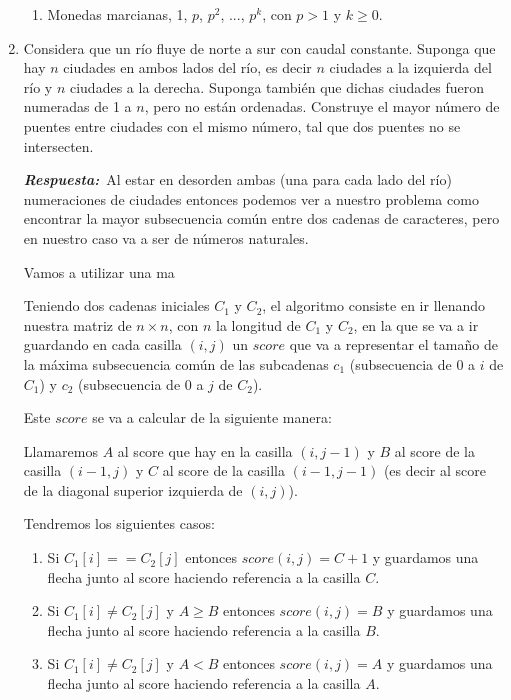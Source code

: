 \documentclass[11pt,letterpaper]{article}
\newcommand\respuesta{\textbf{\textit{Respuesta:}}}
\begin{document}
\begin{enumerate}[leftmargin=*]
\begin{enumerate}[label=\alph*)]
        \item Monedas marcianas, 1, $p$, $p^2$, ..., $p^k$, con $p > 1$ y $k \geq 0$.
    \end{enumerate}
    
    \item Considera que un río fluye de norte a sur con caudal constante. Suponga que hay $n$ ciudades en ambos lados del río, es decir $n$ ciudades a la izquierda del río y $n$ ciudades a la derecha. Suponga también que dichas ciudades fueron numeradas de 1 a $n$, pero no están ordenadas. Construye el mayor número de puentes entre ciudades con el mismo número, tal que dos puentes no se intersecten.

    \respuesta\ Al estar en desorden ambas (una para cada lado del río) numeraciones de ciudades entonces podemos ver a nuestro problema como encontrar la mayor subsecuencia común entre dos cadenas de caracteres, pero en nuestro caso va a ser de números naturales.

    Vamos a utilizar una ma

    Teniendo dos cadenas iniciales $C_1$ y $C_2$, el algoritmo consiste en ir llenando nuestra matriz de $n \times n$, con $n$ la longitud de $C_1$ y $C_2$, en la que se va a ir guardando en cada casilla $(i,j)$ un $score$ que va a representar el tamaño de la máxima subsecuencia común de las subcadenas $c_1$ (subsecuencia de 0 a $i$ de $C_1$) y $c_2$ (subsecuencia de 0 a $j$ de $C_2$).

    Este $score$ se va a calcular de la siguiente manera: 

    Llamaremos $A$ al score que hay en la casilla $(i, j-1)$ y $B$ al score de la casilla $(i-1,j)$ y $C$ al score de la casilla $(i-1, j-1)$ (es decir al score de la diagonal superior izquierda de $(i,j)$).

    Tendremos los siguientes casos:

    \begin{enumerate}[label=\alph*)]
      \item Si $C_1[i] == C_2[j]$ entonces $score(i,j) = C + 1$ y guardamos una flecha junto al score haciendo referencia a la casilla $C$.

      \item Si $C_1[i] \neq C_2[j]$ y $A \geq B$ entonces $score(i,j) = B$ y guardamos una flecha junto al score haciendo referencia a la casilla $B$.

      \item Si $C_1[i] \neq C_2[j]$ y $A < B$ entonces $score(i,j) = A$ y guardamos una flecha junto al score haciendo referencia a la casilla $A$.
    \end{enumerate}


\end{enumerate}
\end{document}
